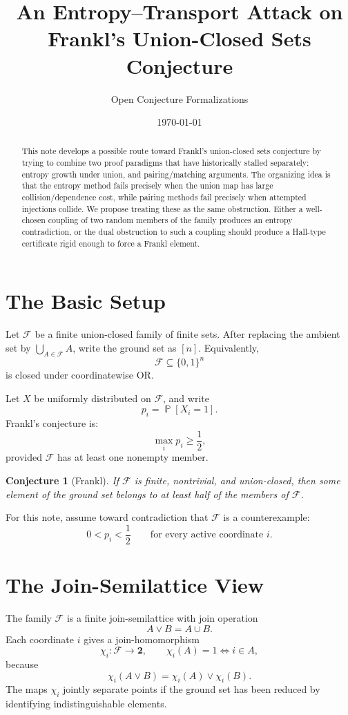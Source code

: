 \documentclass[11pt]{article}
\title{An Entropy--Transport Attack on Frankl's Union-Closed Sets Conjecture}
\author{Open Conjecture Formalizations}
\date{\today}
\newtheorem{conjecture}{Conjecture}
\DeclareMathOperator{\Prb}{\mathbb{P}}
\begin{document}
\maketitle

\begin{abstract}
This note develops a possible route toward Frankl's union-closed sets
conjecture by trying to combine two proof paradigms that have historically
stalled separately: entropy growth under union, and pairing/matching
arguments.  The organizing idea is that the entropy method fails precisely
when the union map has large collision/dependence cost, while pairing methods
fail precisely when attempted injections collide.  We propose treating these
as the same obstruction.  Either a well-chosen coupling of two random members
of the family produces an entropy contradiction, or the dual obstruction to
such a coupling should produce a Hall-type certificate rigid enough to force
a Frankl element.
\end{abstract}

\section{The Basic Setup}

Let $\mathcal{F}$ be a finite union-closed family of finite sets.  After
replacing the ambient set by $\bigcup_{A \in \mathcal{F}} A$, write the ground
set as $[n]$.  Equivalently,
\[
  \mathcal{F} \subseteq \{0,1\}^n
\]
is closed under coordinatewise OR.

Let $X$ be uniformly distributed on $\mathcal{F}$, and write
\[
  p_i = \Prb[X_i = 1].
\]
Frankl's conjecture is:
\[
  \max_i p_i \geq \frac12,
\]
provided $\mathcal{F}$ has at least one nonempty member.

\begin{conjecture}[Frankl]
If $\mathcal{F}$ is finite, nontrivial, and union-closed, then some element of
the ground set belongs to at least half of the members of $\mathcal{F}$.
\end{conjecture}

For this note, assume toward contradiction that $\mathcal{F}$ is a
counterexample:
\[
  0 < p_i < \frac12 \qquad \text{for every active coordinate } i.
\]

\section{The Join-Semilattice View}

The family $\mathcal{F}$ is a finite join-semilattice with join operation
\[
  A \vee B = A \cup B.
\]
Each coordinate $i$ gives a join-homomorphism
\[
  \chi_i : \mathcal{F} \to \mathbf{2},
  \qquad
  \chi_i(A) = 1 \Longleftrightarrow i \in A,
\]
because
\[
  \chi_i(A \vee B) = \chi_i(A) \vee \chi_i(B).
\]
The maps $\chi_i$ jointly separate points if the ground set has been reduced
by identifying indistinguishable elements.
\end{document}
